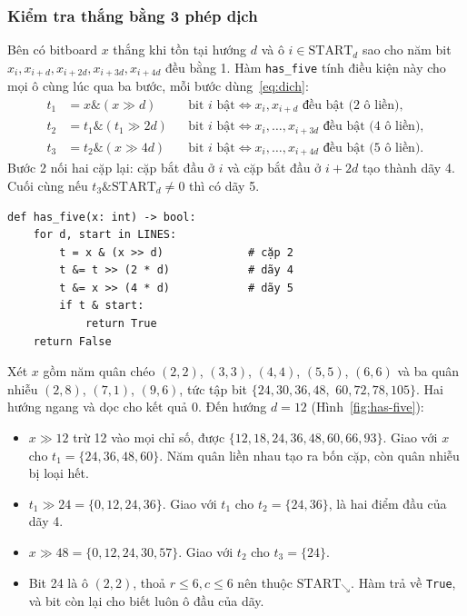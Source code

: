 \subsubsection{Kiểm tra thắng bằng 3 phép dịch}
Bên có bitboard $x$ thắng khi tồn tại hướng $d$ và ô $i \in \mathrm{START}_d$ sao cho năm bit $x_i, x_{i+d}, x_{i+2d}, x_{i+3d}, x_{i+4d}$ đều bằng 1. Hàm \texttt{has\_five} tính điều kiện này cho mọi ô cùng lúc qua ba bước, mỗi bước dùng~\eqref{eq:dich}:
\begin{align}
  t_1 &= x \mathbin{\&} (x \gg d)     && \text{bit } i \text{ bật} \iff x_i, x_{i+d} \text{ đều bật (2 ô liền)}, \\
  t_2 &= t_1 \mathbin{\&} (t_1 \gg 2d) && \text{bit } i \text{ bật} \iff x_i, \dots, x_{i+3d} \text{ đều bật (4 ô liền)}, \\
  t_3 &= t_2 \mathbin{\&} (x \gg 4d)   && \text{bit } i \text{ bật} \iff x_i, \dots, x_{i+4d} \text{ đều bật (5 ô liền)}.
\end{align}
Bước 2 nối hai cặp lại: cặp bắt đầu ở $i$ và cặp bắt đầu ở $i + 2d$ tạo thành dãy 4. Cuối cùng nếu $t_3 \mathbin{\&} \mathrm{START}_d \ne 0$ thì có dãy 5.

\noindent\begin{minipage}{\linewidth}
\begin{lstlisting}[caption={Kiểm tra thắng trong caro/engine/bitboard.py.}, label={lst:has-five}, numbers=none]
def has_five(x: int) -> bool:
    for d, start in LINES:
        t = x & (x >> d)             # cặp 2
        t &= t >> (2 * d)            # dãy 4
        t &= x >> (4 * d)            # dãy 5
        if t & start:
            return True
    return False
\end{lstlisting}
\end{minipage}

\begin{vidu}
Xét $x$ gồm năm quân chéo $(2,2)$, $(3,3)$, $(4,4)$, $(5,5)$, $(6,6)$ và ba quân nhiễu $(2,8)$, $(7,1)$, $(9,6)$, tức tập bit $\{24, 30, 36, 48,$ $60, 72, 78, 105\}$. Hai hướng ngang và dọc cho kết quả 0. Đến hướng $d = 12$ (Hình~\ref{fig:has-five}):
\begin{itemize}
  \item $x \gg 12$ trừ 12 vào mọi chỉ số, được $\{12, 18, 24, 36, 48, 60, 66, 93\}$. Giao với $x$ cho $t_1 = \{24, 36, 48, 60\}$. Năm quân liền nhau tạo ra bốn cặp, còn quân nhiễu bị loại hết.
  \item $t_1 \gg 24 = \{0, 12, 24, 36\}$. Giao với $t_1$ cho $t_2 = \{24, 36\}$, là hai điểm đầu của dãy 4.
  \item $x \gg 48 = \{0, 12, 24, 30, 57\}$. Giao với $t_2$ cho $t_3 = \{24\}$.
  \item Bit 24 là ô $(2, 2)$, thoả $r \le 6, c \le 6$ nên thuộc $\mathrm{START}_{\searrow}$. Hàm trả về \texttt{True}, và bit còn lại cho biết luôn ô đầu của dãy.
\end{itemize}
\end{vidu}

